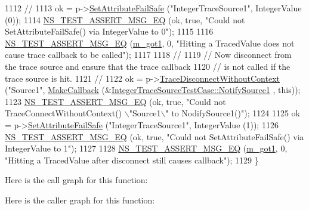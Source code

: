 \begin{DoxyCode}
1112   \textcolor{comment}{//}
1113   ok = p->\hyperlink{classns3_1_1ObjectBase_aa7d333004e970f925a4ed5df275541b5}{SetAttributeFailSafe} (\textcolor{stringliteral}{"IntegerTraceSource1"}, IntegerValue (0));
1114   \hyperlink{group__testing_ga2a9d78cffb3db8e867c35fff0b698cf5}{NS\_TEST\_ASSERT\_MSG\_EQ} (ok, \textcolor{keyword}{true}, \textcolor{stringliteral}{"Could not SetAttributeFailSafe() via IntegerValue
       to 0"});
1115 
1116   \hyperlink{group__testing_ga2a9d78cffb3db8e867c35fff0b698cf5}{NS\_TEST\_ASSERT\_MSG\_EQ} (\hyperlink{classIntegerTraceSourceTestCase_a191fafb3fcaa0c793101de8af0ff6ada}{m\_got1}, 0, \textcolor{stringliteral}{"Hitting a TracedValue does not cause trace
       callback to be called"});
1117 
1118   \textcolor{comment}{//}
1119   \textcolor{comment}{// Now disconnect from the trace source and ensure that the trace callback}
1120   \textcolor{comment}{// is not called if the trace source is hit.}
1121   \textcolor{comment}{//}
1122   ok = p->\hyperlink{classns3_1_1ObjectBase_a460d74131ef97d9d7ba79c6d70b2f304}{TraceDisconnectWithoutContext} (\textcolor{stringliteral}{"Source1"}, 
      \hyperlink{group__makecallbackmemptr_ga9376283685aa99d204048d6a4b7610a4}{MakeCallback} (&\hyperlink{classIntegerTraceSourceTestCase_af8fe2912cc7dd753132471139207a62b}{IntegerTraceSourceTestCase::NotifySource1}
      , \textcolor{keyword}{this}));
1123   \hyperlink{group__testing_ga2a9d78cffb3db8e867c35fff0b698cf5}{NS\_TEST\_ASSERT\_MSG\_EQ} (ok, \textcolor{keyword}{true}, \textcolor{stringliteral}{"Could not TraceConnectWithoutContext() \(\backslash\)"Source1\(\backslash\)"
       to NodifySource1()"});
1124 
1125   ok = p->\hyperlink{classns3_1_1ObjectBase_aa7d333004e970f925a4ed5df275541b5}{SetAttributeFailSafe} (\textcolor{stringliteral}{"IntegerTraceSource1"}, IntegerValue (1));
1126   \hyperlink{group__testing_ga2a9d78cffb3db8e867c35fff0b698cf5}{NS\_TEST\_ASSERT\_MSG\_EQ} (ok, \textcolor{keyword}{true}, \textcolor{stringliteral}{"Could not SetAttributeFailSafe() via IntegerValue
       to 1"});
1127 
1128   \hyperlink{group__testing_ga2a9d78cffb3db8e867c35fff0b698cf5}{NS\_TEST\_ASSERT\_MSG\_EQ} (\hyperlink{classIntegerTraceSourceTestCase_a191fafb3fcaa0c793101de8af0ff6ada}{m\_got1}, 0, \textcolor{stringliteral}{"Hitting a TracedValue after disconnect
       still causes callback"});
1129 \}
\end{DoxyCode}


Here is the call graph for this function\+:




Here is the caller graph for this function\+:


